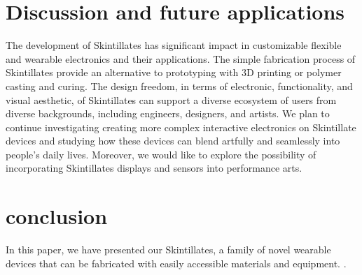 \documentclass{sigchi}
\begin{document}
\section {Discussion and future applications}
The development of Skintillates has significant impact in customizable flexible and wearable electronics and their applications. The simple fabrication process of Skintillates provide an alternative to prototyping with 3D printing or polymer casting and curing.  The design freedom, in terms of electronic, functionality, and visual aesthetic, of Skintillates can support a diverse ecosystem of users from diverse backgrounds, including engineers, designers, and artists. We plan to continue investigating creating more complex interactive electronics on Skintillate devices and studying how these devices can blend artfully and seamlessly into people's daily lives. Moreover, we would like to explore the possibility of incorporating Skintillates displays and sensors into performance arts. 

\section {conclusion}
In this paper, we have presented our Skintillates, a family of novel wearable devices that can be fabricated with easily accessible materials and equipment. 
 \cite{Kim:2015ii}.





%
%
%
%
%
\balance



\end{document}

